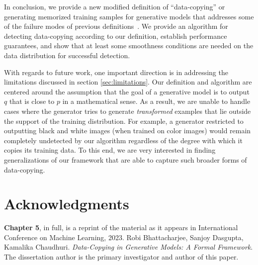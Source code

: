 In conclusion, we provide a new modified definition of ``data-copying'' or generating memorized training samples for generative models that addresses some of the failure modes of previous definitions~\cite{MCD2020}. We provide an algorithm for detecting data-copying according to our definition, establish performance guarantees, and show that at least some smoothness conditions are needed on the data distribution for successful detection. 

With regards to future work, one important direction is in addressing the limitations discussed in section \ref{sec:limitations}. Our definition and algorithm are centered around the assumption that the goal of a generative model is to output $q$ that is close to $p$ in a mathematical sense. As a result, we are unable to handle cases where the generator tries to generate \textit{transformed} examples that lie outside the support of the training distribution. For example, a generator restricted to outputting black and white images (when trained on color images) would remain completely undetected by our algorithm regardless of the degree with which it copies its training data. To this end, we are very interested in finding generalizations of our framework that are able to capture such broader forms of data-copying. 

\section*{Acknowledgments}
\textbf{Chapter 5}, in full, is a reprint of the material as it appears in International Conference on Machine Learning, 2023. Robi Bhattacharjee, Sanjoy Dasgupta, Kamalika Chaudhuri. \emph{Data-Copying in Generative Models: A Formal Framework}. The dissertation author is the primary investigator and author of this paper. 








%
%
%
%
%
%
%